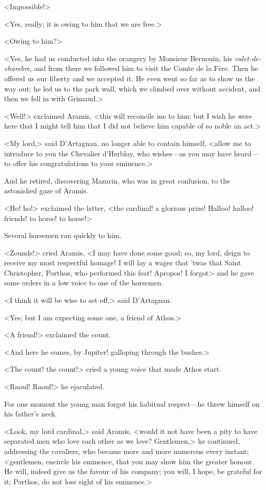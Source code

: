 <Impossible!>

<Yes, really; it is owing to him that we are free.>

<Owing to him?>

<Yes, he had us conducted into the orangery by Monsieur Bernouin, his \textit{valet-de-chambre}, and from there we followed him to visit the Comte de la Fère. Then he offered us our liberty and we accepted it. He even went so far as to show us the way out; he led us to the park wall, which we climbed over without accident, and then we fell in with Grimaud.>

<Well!> exclaimed Aramis, <this will reconcile me to him; but I wish he were here that I might tell him that I did not believe him capable of so noble an act.>

<My lord,> said D'Artagnan, no longer able to contain himself, <allow me to introduce to you the Chevalier d'Herblay, who wishes—as you may have heard—to offer his congratulations to your eminence.>

And he retired, discovering Mazarin, who was in great confusion, to the astonished gaze of Aramis.

<Ho! ho!> exclaimed the latter, <the cardinal! a glorious prize! Halloo! halloo! friends! to horse! to horse!>

Several horsemen ran quickly to him.

<Zounds!> cried Aramis, <I may have done some good; so, my lord, deign to receive my most respectful homage! I will lay a wager that 'twas that Saint Christopher, Porthos, who performed this feat! Apropos! I forgot\longdash> and he gave some orders in a low voice to one of the horsemen.

<I think it will be wise to set off,> said D'Artagnan.

<Yes; but I am expecting some one, a friend of Athos.>

<A friend!> exclaimed the count.

<And here he comes, by Jupiter! galloping through the bushes.>

<The count! the count!> cried a young voice that made Athos start.

<Raoul! Raoul!> he ejaculated.

For one moment the young man forgot his habitual respect—he threw himself on his father's neck.

<Look, my lord cardinal,> said Aramis, <would it not have been a pity to have separated men who love each other as we love? Gentlemen,> he continued, addressing the cavaliers, who became more and more numerous every instant; <gentlemen, encircle his eminence, that you may show him the greater honour. He will, indeed give us the favour of his company; you will, I hope, be grateful for it; Porthos, do not lose sight of his eminence.>

